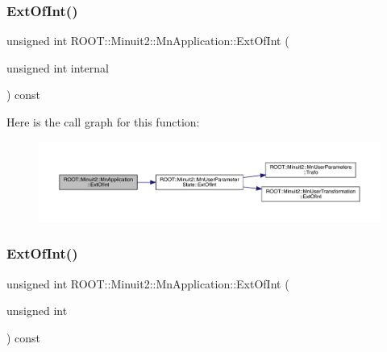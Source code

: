 \mbox{\label{classROOT_1_1Minuit2_1_1MnApplication_a61dc63d2a6320aae96867ad57918c496}} 
\subsubsection{\texorpdfstring{ExtOfInt()}{ExtOfInt()}\hspace{0.1cm}{\footnotesize\ttfamily [1/3]}}
{\footnotesize\ttfamily unsigned int R\+O\+O\+T\+::\+Minuit2\+::\+Mn\+Application\+::\+Ext\+Of\+Int (\begin{DoxyParamCaption}\item[{unsigned int}]{internal }\end{DoxyParamCaption}) const}

Here is the call graph for this function\+:
\nopagebreak
\begin{figure}[H]
\begin{center}
\leavevmode
\includegraphics[width=350pt]{df/dd5/classROOT_1_1Minuit2_1_1MnApplication_a61dc63d2a6320aae96867ad57918c496_cgraph}
\end{center}
\end{figure}
\mbox{\label{classROOT_1_1Minuit2_1_1MnApplication_a61dc63d2a6320aae96867ad57918c496}} 
\subsubsection{\texorpdfstring{ExtOfInt()}{ExtOfInt()}\hspace{0.1cm}{\footnotesize\ttfamily [2/3]}}
{\footnotesize\ttfamily unsigned int R\+O\+O\+T\+::\+Minuit2\+::\+Mn\+Application\+::\+Ext\+Of\+Int (\begin{DoxyParamCaption}\item[{unsigned int}]{ }\end{DoxyParamCaption}) const}

